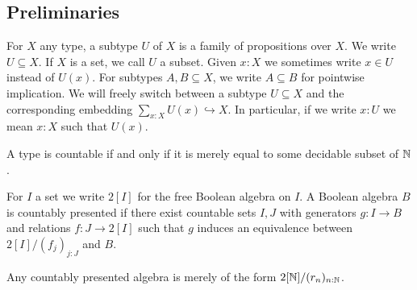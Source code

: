 \subsection{Preliminaries}
%
\begin{remark}
  For $X$ any type, a subtype $U$ of $X$ is a family of propositions over $X$. 
  We write $U\subseteq X$.
  If $X$ is a set, we call $U$ a subset. Given $x:X$ we sometimes write $x\in U$ instead of $U(x)$. %
  For subtypes $A,B\subseteq X$, we write $A\subseteq B$ for pointwise implication.
  We will freely switch between a subtype $U\subseteq X$ %
  and the corresponding embedding
  $
    \sum_{x:X}U(x) \hookrightarrow  X.
  $
In particular, if we write $x: U$ we mean $x:X$ such that $U(x)$.
\end{remark}

\begin{definition}
  A type is countable if and only if it is 
  merely equal to some decidable subset of $\mathbb{N}$. 
\end{definition}

\begin{definition}
  For $I$ a set we write $2[I]$ for the free Boolean algebra on $I$.
  A Boolean algebra $B$ is countably presented if there exist countable sets $I,J$ with generators $g:I\to B$ and relations $f:J\to 2[I]$ 
  such that $g$ induces an equivalence between $2[I]/(f_j)_{j:J}$ and $B$.
\end{definition} 

\begin{remark}\label{BooleAsCQuotient}
Any countably presented algebra is merely of the form 
$2[\mathbb{N}]/ (r_n)_{n:\mathbb{N}}$.
\end{remark}



